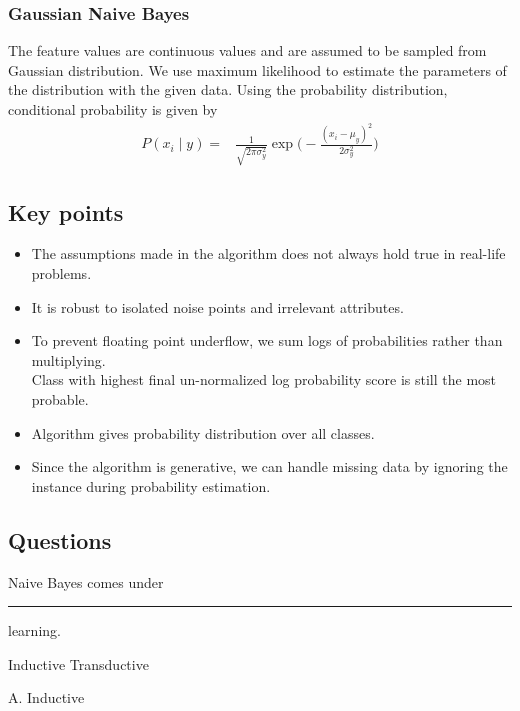 \documentclass[12pt,letterpaper, onecolumn]{exam}
\begin{document}
\subsubsection*{Gaussian Naive Bayes}
The feature values are continuous values and are assumed to be sampled from Gaussian distribution. We use maximum likelihood to estimate the parameters of the distribution with the given data. Using the probability distribution, conditional probability is given by
\begin{align}
P(x_i\mid y) = {}& \frac{1}{\sqrt{2\pi \sigma_y^2}}\exp\Big(-\frac{(x_i - \mu_y)^2}{2 \sigma_y^2}\Big)
\end{align}
\subsection*{Key points}
\begin{itemize}
\item The assumptions made in the algorithm does not always hold true in real-life problems.
\item It is robust to isolated noise points and irrelevant attributes.
\item To prevent floating point underflow, we sum logs of probabilities rather than multiplying.\\ Class with highest final un-normalized log probability score is still 
the most probable.
\item Algorithm gives probability distribution over all classes.
\item Since the algorithm is generative, we can handle missing data by ignoring the instance during probability estimation.
\end{itemize}
\subsection{Questions}
\begin{questions}
\question[] Naive Bayes comes under \rule{2.5cm}{0.15mm} learning.
\begin{choices}
\choice Inductive
\choice Transductive
\end{choices}
\begin{Solution}
A. Inductive
\end{Solution}


\end{questions}
\end{document}
